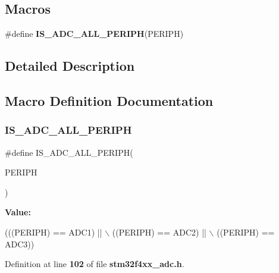 \subsection*{Macros}
\begin{DoxyCompactItemize}
\item 
\#define \textbf{ I\+S\+\_\+\+A\+D\+C\+\_\+\+A\+L\+L\+\_\+\+P\+E\+R\+I\+PH}(P\+E\+R\+I\+PH)
\end{DoxyCompactItemize}


\subsection{Detailed Description}


\subsection{Macro Definition Documentation}
\mbox{\label{group__ADC__Exported__Constants_gaf5d6bd0153464912e0eaccb1af1aefb2}} 
\subsubsection{I\+S\+\_\+\+A\+D\+C\+\_\+\+A\+L\+L\+\_\+\+P\+E\+R\+I\+PH}
{\footnotesize\ttfamily \#define I\+S\+\_\+\+A\+D\+C\+\_\+\+A\+L\+L\+\_\+\+P\+E\+R\+I\+PH(\begin{DoxyParamCaption}\item[{}]{P\+E\+R\+I\+PH }\end{DoxyParamCaption})}

{\bfseries Value\+:}
\begin{DoxyCode}
(((PERIPH) == ADC1) || \(\backslash\)
                                   ((PERIPH) == ADC2) || \(\backslash\)
                                   ((PERIPH) == ADC3))
\end{DoxyCode}


Definition at line \textbf{ 102} of file \textbf{ stm32f4xx\+\_\+adc.\+h}.

